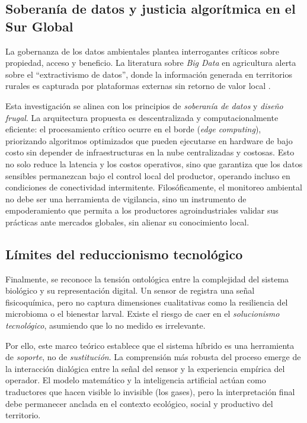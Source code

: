 \subsection{Soberanía de datos y justicia algorítmica en el Sur Global}
La gobernanza de los datos ambientales plantea interrogantes críticos sobre propiedad, acceso y beneficio. La literatura sobre \textit{Big Data} en agricultura alerta sobre el ``extractivismo de datos'', donde la información generada en territorios rurales es capturada por plataformas externas sin retorno de valor local \parencite{carolanAutomatedAgrifoodFutures2020}.

Esta investigación se alinea con los principios de \textit{soberanía de datos} y \textit{diseño frugal}. La arquitectura propuesta es descentralizada y computacionalmente eficiente: el procesamiento crítico ocurre en el borde (\textit{edge computing}), priorizando algoritmos optimizados que pueden ejecutarse en hardware de bajo costo sin depender de infraestructuras en la nube centralizadas y costosas. Esto no solo reduce la latencia y los costos operativos, sino que garantiza que los datos sensibles permanezcan bajo el control local del productor, operando incluso en condiciones de conectividad intermitente. Filosóficamente, el monitoreo ambiental no debe ser una herramienta de vigilancia, sino un instrumento de empoderamiento que permita a los productores agroindustriales validar sus prácticas ante mercados globales, sin alienar su conocimiento local.

\subsection{Límites del reduccionismo tecnológico}
Finalmente, se reconoce la tensión ontológica entre la complejidad del sistema biológico y su representación digital. Un sensor de  registra una señal fisicoquímica, pero no captura dimensiones cualitativas como la resiliencia del microbioma o el bienestar larval. Existe el riesgo de caer en el \textit{solucionismo tecnológico}, asumiendo que lo no medido es irrelevante.

Por ello, este marco teórico establece que el sistema híbrido es una herramienta de \textit{soporte}, no de \textit{sustitución}. La comprensión más robusta del proceso emerge de la interacción dialógica entre la señal del sensor y la experiencia empírica del operador. El modelo matemático y la inteligencia artificial actúan como traductores que hacen visible lo invisible (los gases), pero la interpretación final debe permanecer anclada en el contexto ecológico, social y productivo del territorio.